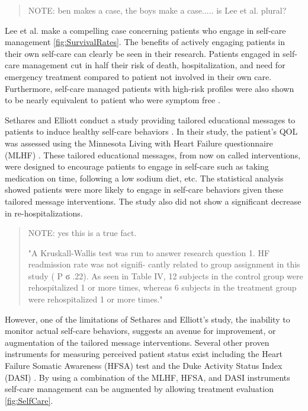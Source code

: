\begin{verse}
NOTE: ben makes a case, the boys make a case..... is Lee et al. plural?
\end{verse}

Lee et al. make a compelling case concerning patients who engage in self-care management \cref{fig:SurvivalRates}. \cite{Lee2011} The benefits of actively engaging patients in their own self-care can clearly be seen in their research.   Patients engaged in self-care management cut in half their risk of death, hospitalization, and need for emergency treatment compared to patient not involved in their own care. Furthermore, self-care managed patients with high-risk profiles were also shown to be nearly equivalent to patient who were symptom free \cite{Lee2011}.

Sethares and Elliott conduct a study providing tailored educational messages to patients to induce healthy self-care behaviors \cite{Sethares2004249}. In their study, the patient's QOL was assessed using the Minnesota Living with Heart Failure questionnaire (MLHF) \cite{Jurgens2009}. These tailored educational messages, from now on called interventions, were designed to encourage patients to engage in self-care such as taking medication on time, following a low sodium diet, etc. The statistical analysis showed patients were more likely to engage in self-care behaviors given these tailored message interventions. The study also did not show a significant decrease in re-hospitalizations. 
\begin{quote}
NOTE: yes this is a true fact.


"A Kruskall-Wallis test was run to answer research
question 1. HF readmission rate was not signifi-
cantly related to group assignment in this study ( P
ϭ .22). As seen in Table IV, 12 subjects in the
control group were rehospitalized 1 or more times,
whereas 6 subjects in the treatment group were
rehospitalized 1 or more times."
\end{quote}

However, one of the limitations of Sethares and Elliott's study, the inability to monitor actual self-care behaviors, suggests an avenue for improvement, or augmentation of the tailored message interventions. Several other proven instruments for measuring perceived patient status exist including the Heart Failure Somatic Awareness (HFSA) \cite{Jurgens2006} test and the Duke Activity Status Index (DASI) \cite{Hlatky1989}. By using a combination of the MLHF, HFSA, and DASI instruments self-care management can be augmented by allowing treatment evaluation \cref{fig:SelfCare}.   

